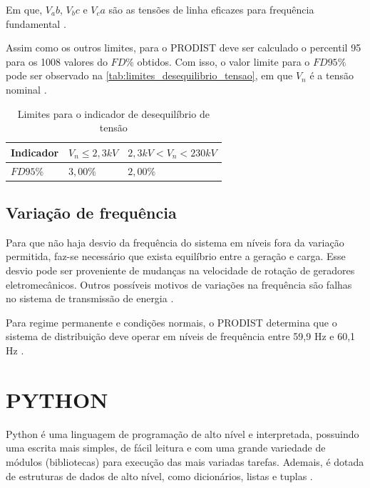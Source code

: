 Em que, $V_ab$, $V_bc$ e $V_ca$ são as tensões de linha eficazes para frequência fundamental \cite{ref:ANEEL2021}.

Assim como os outros limites, para o PRODIST deve ser calculado o percentil 95 para os 1008 valores do $FD\%$ obtidos. Com isso, o valor limite para o $FD95\%$ pode ser observado na \autoref{tab:limites_desequilibrio_tensao}, em que $V_n$ é a tensão nominal \cite{ref:ANEEL2021}.

\begin{table}[H]
  \centering
  \caption{Limites para o indicador de desequilíbrio de tensão}
  \label{tab:limites_desequilibrio_tensao}
  \begin{tabular}{@{}lll@{}}
  \toprule
  \textbf{Indicador} & \textbf{$V_n \leq  2,3 kV$} & \textbf{$2,3 kV < V_n  < 230 kV$} \\ \midrule
  $FD95\%$ & $3,00\%$ & $2,00\%$ \\ \bottomrule
  \end{tabular}
\end{table}

\subsection{Variação de frequência}

Para que não haja desvio da frequência do sistema em níveis fora da variação permitida, faz-se necessário que exista equilíbrio entre a geração e carga. Esse desvio pode ser proveniente de mudanças na velocidade de rotação de geradores eletromecânicos. Outros possíveis motivos de variações na frequência são falhas no sistema de transmissão de energia \cite{ref:fuchs_2015}.

Para regime permanente e condições normais, o PRODIST determina que o sistema de distribuição deve operar em níveis de frequência entre 59,9 Hz e 60,1 Hz \cite{ref:ANEEL2021}. 


\section{PYTHON}

Python é uma linguagem de programação de alto nível e interpretada, possuindo uma escrita mais simples, de fácil leitura e com uma grande variedade de módulos (bibliotecas) para execução das mais variadas tarefas. Ademais, é dotada de estruturas de dados de alto nível, como dicionários, listas e tuplas \cite{ref:borges_2014}.

